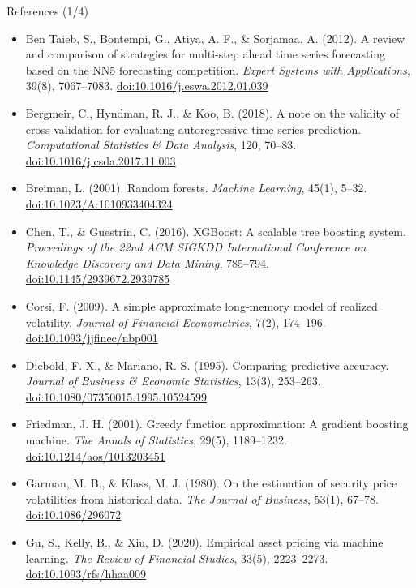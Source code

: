 \begin{frame}{References (1/4)}
\itemsize{\scriptsize}
\begin{itemize}
    \item Ben Taieb, S., Bontempi, G., Atiya, A. F., \& Sorjamaa, A. (2012). A review and comparison of strategies for multi-step ahead time series forecasting based on the NN5 forecasting competition. \textit{Expert Systems with Applications}, 39(8), 7067--7083. \href{https://doi.org/10.1016/j.eswa.2012.01.039}{doi:10.1016/j.eswa.2012.01.039}
    \item Bergmeir, C., Hyndman, R. J., \& Koo, B. (2018). A note on the validity of cross-validation for evaluating autoregressive time series prediction. \textit{Computational Statistics \& Data Analysis}, 120, 70--83. \href{https://doi.org/10.1016/j.csda.2017.11.003}{doi:10.1016/j.csda.2017.11.003}
    \item Breiman, L. (2001). Random forests. \textit{Machine Learning}, 45(1), 5--32. \href{https://doi.org/10.1023/A:1010933404324}{doi:10.1023/A:1010933404324}
    \item Chen, T., \& Guestrin, C. (2016). XGBoost: A scalable tree boosting system. \textit{Proceedings of the 22nd ACM SIGKDD International Conference on Knowledge Discovery and Data Mining}, 785--794. \href{https://doi.org/10.1145/2939672.2939785}{doi:10.1145/2939672.2939785}
    \item Corsi, F. (2009). A simple approximate long-memory model of realized volatility. \textit{Journal of Financial Econometrics}, 7(2), 174--196. \href{https://doi.org/10.1093/jjfinec/nbp001}{doi:10.1093/jjfinec/nbp001}
    \item Diebold, F. X., \& Mariano, R. S. (1995). Comparing predictive accuracy. \textit{Journal of Business \& Economic Statistics}, 13(3), 253--263. \href{https://doi.org/10.1080/07350015.1995.10524599}{doi:10.1080/07350015.1995.10524599}
    \item Friedman, J. H. (2001). Greedy function approximation: A gradient boosting machine. \textit{The Annals of Statistics}, 29(5), 1189--1232. \href{https://doi.org/10.1214/aos/1013203451}{doi:10.1214/aos/1013203451}
    \item Garman, M. B., \& Klass, M. J. (1980). On the estimation of security price volatilities from historical data. \textit{The Journal of Business}, 53(1), 67--78. \href{https://doi.org/10.1086/296072}{doi:10.1086/296072}
    \item Gu, S., Kelly, B., \& Xiu, D. (2020). Empirical asset pricing via machine learning. \textit{The Review of Financial Studies}, 33(5), 2223--2273. \href{https://doi.org/10.1093/rfs/hhaa009}{doi:10.1093/rfs/hhaa009}
\end{itemize}
\end{frame}

